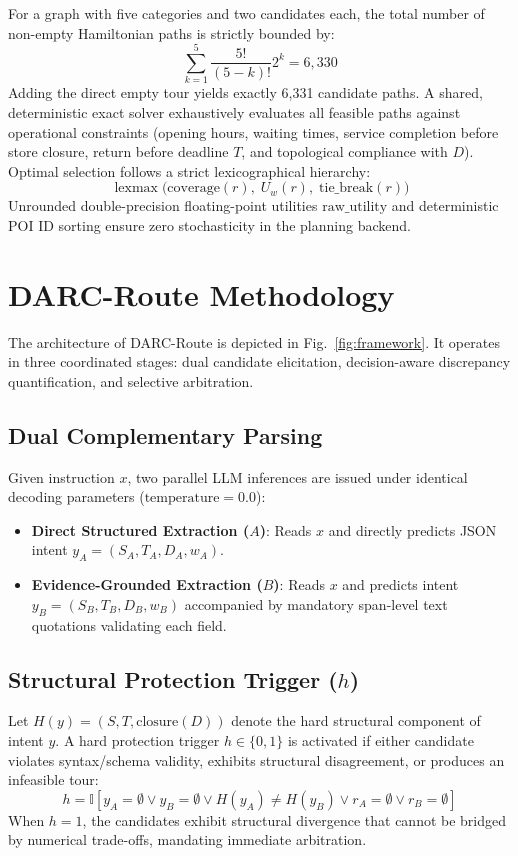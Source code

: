 \documentclass[conference]{IEEEtran}
\begin{document}
For a graph with five categories and two candidates each, the total number of non-empty Hamiltonian paths is strictly bounded by:
\begin{equation}
\sum_{k=1}^{5} \frac{5!}{(5-k)!} 2^k = 6,330
\end{equation}
Adding the direct empty tour yields exactly 6,331 candidate paths. A shared, deterministic exact solver exhaustively evaluates all feasible paths against operational constraints (opening hours, waiting times, service completion before store closure, return before deadline $T$, and topological compliance with $D$). Optimal selection follows a strict lexicographical hierarchy:
\begin{equation}
\operatorname{lexmax} \Big( \text{coverage}(r), \; U_w(r), \; \text{tie\_break}(r) \Big)
\end{equation}
Unrounded double-precision floating-point utilities $\text{raw\_utility}$ and deterministic POI ID sorting ensure zero stochasticity in the planning backend.

\section{DARC-Route Methodology}

The architecture of DARC-Route is depicted in Fig.~\ref{fig:framework}. It operates in three coordinated stages: dual candidate elicitation, decision-aware discrepancy quantification, and selective arbitration.

\subsection{Dual Complementary Parsing}
Given instruction $x$, two parallel LLM inferences are issued under identical decoding parameters ($\text{temperature} = 0.0$):
\begin{itemize}
    \item \textbf{Direct Structured Extraction ($A$)}: Reads $x$ and directly predicts JSON intent $y_A = (S_A, T_A, D_A, w_A)$.
    \item \textbf{Evidence-Grounded Extraction ($B$)}: Reads $x$ and predicts intent $y_B = (S_B, T_B, D_B, w_B)$ accompanied by mandatory span-level text quotations validating each field.
\end{itemize}

\subsection{Structural Protection Trigger ($h$)}
Let $H(y) = (S, T, \text{closure}(D))$ denote the hard structural component of intent $y$. A hard protection trigger $h \in \{0, 1\}$ is activated if either candidate violates syntax/schema validity, exhibits structural disagreement, or produces an infeasible tour:
\begin{equation}
h = \mathbb{I}[y_A = \emptyset \lor y_B = \emptyset \lor H(y_A) \neq H(y_B) \lor r_A = \emptyset \lor r_B = \emptyset]
\end{equation}
When $h = 1$, the candidates exhibit structural divergence that cannot be bridged by numerical trade-offs, mandating immediate arbitration.
\end{document}
